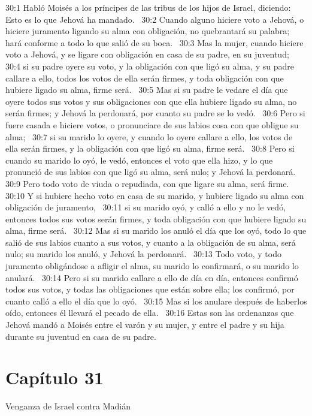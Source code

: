 30:1 Habló Moisés a los príncipes de las tribus de los hijos de Israel, diciendo: Esto es lo que Jehová ha mandado.  
30:2 Cuando alguno hiciere voto a Jehová, o hiciere juramento ligando su alma con obligación, no quebrantará su palabra; hará conforme a todo lo que salió de su boca.  
30:3 Mas la mujer, cuando hiciere voto a Jehová, y se ligare con obligación en casa de su padre, en su juventud;  
30:4 si su padre oyere su voto, y la obligación con que ligó su alma, y su padre callare a ello, todos los votos de ella serán firmes, y toda obligación con que hubiere ligado su alma, firme será.  
30:5 Mas si su padre le vedare el día que oyere todos sus votos y sus obligaciones con que ella hubiere ligado su alma, no serán firmes; y Jehová la perdonará, por cuanto su padre se lo vedó.  
30:6 Pero si fuere casada e hiciere votos, o pronunciare de sus labios cosa con que obligue su alma;  
30:7 si su marido lo oyere, y cuando lo oyere callare a ello, los votos de ella serán firmes, y la obligación con que ligó su alma, firme será.  
30:8 Pero si cuando su marido lo oyó, le vedó, entonces el voto que ella hizo, y lo que pronunció de sus labios con que ligó su alma, será nulo; y Jehová la perdonará.  
30:9 Pero todo voto de viuda o repudiada, con que ligare su alma, será firme.  
30:10 Y si hubiere hecho voto en casa de su marido, y hubiere ligado su alma con obligación de juramento,  
30:11 si su marido oyó, y calló a ello y no le vedó, entonces todos sus votos serán firmes, y toda obligación con que hubiere ligado su alma, firme será.  
30:12 Mas si su marido los anuló el día que los oyó, todo lo que salió de sus labios cuanto a sus votos, y cuanto a la obligación de su alma, será nulo; su marido los anuló, y Jehová la perdonará.  
30:13 Todo voto, y todo juramento obligándose a afligir el alma, su marido lo confirmará, o su marido lo anulará.  
30:14 Pero si su marido callare a ello de día en día, entonces confirmó todos sus votos, y todas las obligaciones que están sobre ella; los confirmó, por cuanto calló a ello el día que lo oyó.  
30:15 Mas si los anulare después de haberlos oído, entonces él llevará el pecado de ella.  
30:16 Estas son las ordenanzas que Jehová mandó a Moisés entre el varón y su mujer, y entre el padre y su hija durante su juventud en casa de su padre.  
\section*{Capítulo 31 }
Venganza de Israel contra Madián  


